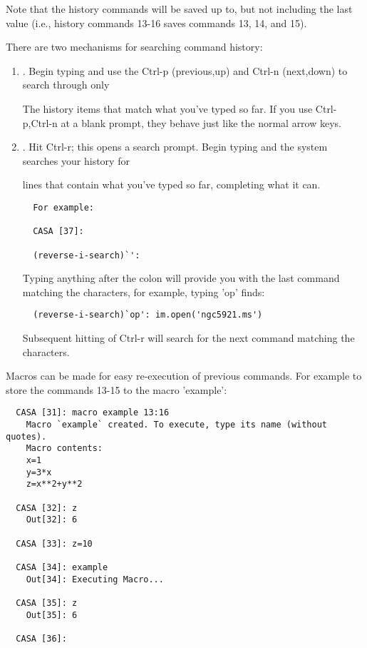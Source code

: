 Note that the history commands will be saved up to, but not including
the last value (i.e., history commands 13-16 saves commands 13, 14,
and 15). 

There are two mechanisms for searching command history:

\begin{enumerate}
   \item. Begin typing and use the Ctrl-p (previous,up) and Ctrl-n
          (next,down) to search through only  

          The history items that match what you've typed so far. If
	  you use Ctrl-p,Ctrl-n at a blank prompt, they behave just
	  like the normal arrow keys.

   \item. Hit Ctrl-r; this opens a search prompt. Begin typing and the
          system searches your history for  

	  lines that contain what you've typed so far, completing what
	  it can. 

\small
\begin{verbatim}
  For example:

  CASA [37]:

  (reverse-i-search)`':
\end{verbatim}
\normalsize

          Typing anything after the colon will provide you with the
	  last command matching the characters, for example, typing
	  'op' finds:

\small
\begin{verbatim}
  (reverse-i-search)`op': im.open('ngc5921.ms')
\end{verbatim}
\normalsize

          Subsequent hitting of Ctrl-r will search for the next
          command matching the characters. 
\end{enumerate}

\vspace{3mm}

Macros can be made for easy re-execution of previous commands. For
example to store the commands 13-15 to the macro 'example': 

\small
\begin{verbatim}
  CASA [31]: macro example 13:16
    Macro `example` created. To execute, type its name (without quotes).
    Macro contents:
    x=1
    y=3*x
    z=x**2+y**2

  CASA [32]: z
    Out[32]: 6

  CASA [33]: z=10

  CASA [34]: example
    Out[34]: Executing Macro...

  CASA [35]: z
    Out[35]: 6

  CASA [36]:
\end{verbatim}
\normalsize

